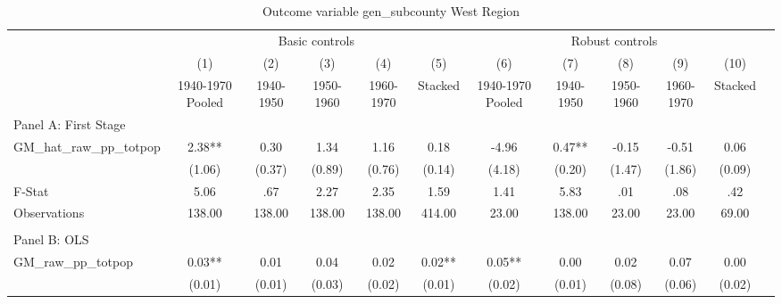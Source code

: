  \begin{table}[htbp]\centering {} \begin{threeparttable} \caption{Outcome variable gen\_subcounty West Region} \begin{tabular}{l*{11}{c}} \toprule
          &\multicolumn{5}{c}{Basic controls}                                   &\multicolumn{5}{c}{Robust controls}                                  \\\cmidrule(lr){2-6}\cmidrule(lr){7-11}
          &\multicolumn{1}{c}{(1)}&\multicolumn{1}{c}{(2)}&\multicolumn{1}{c}{(3)}&\multicolumn{1}{c}{(4)}&\multicolumn{1}{c}{(5)}&\multicolumn{1}{c}{(6)}&\multicolumn{1}{c}{(7)}&\multicolumn{1}{c}{(8)}&\multicolumn{1}{c}{(9)}&\multicolumn{1}{c}{(10)}\\
          &\multicolumn{1}{c}{1940-1970 Pooled}&\multicolumn{1}{c}{1940-1950}&\multicolumn{1}{c}{1950-1960}&\multicolumn{1}{c}{1960-1970}&\multicolumn{1}{c}{Stacked}&\multicolumn{1}{c}{1940-1970 Pooled}&\multicolumn{1}{c}{1940-1950}&\multicolumn{1}{c}{1950-1960}&\multicolumn{1}{c}{1960-1970}&\multicolumn{1}{c}{Stacked}\\
\cmidrule(lr){1-11}
\multicolumn{10}{l}{Panel A: First Stage}\\
\cmidrule(lr){1-11}
GM\_hat\_raw\_pp\_totpop&      2.38** &      0.30   &      1.34   &      1.16   &      0.18   &     -4.96   &      0.47** &     -0.15   &     -0.51   &      0.06   \\
          &    (1.06)   &    (0.37)   &    (0.89)   &    (0.76)   &    (0.14)   &    (4.18)   &    (0.20)   &    (1.47)   &    (1.86)   &    (0.09)   \\
\midrule
F-Stat    &      5.06   &       .67   &      2.27   &      2.35   &      1.59   &      1.41   &      5.83   &       .01   &       .08   &       .42   \\
Observations&    138.00   &    138.00   &    138.00   &    138.00   &    414.00   &     23.00   &    138.00   &     23.00   &     23.00   &     69.00   \\
\cmidrule[\heavyrulewidth](lr){1-11} \\ \cmidrule[\heavyrulewidth](lr){1-11}
\multicolumn{10}{l}{Panel B: OLS}\\
\cmidrule(lr){1-11}
GM\_raw\_pp\_totpop&      0.03** &      0.01   &      0.04   &      0.02   &      0.02** &      0.05** &      0.00   &      0.02   &      0.07   &      0.00   \\
          &    (0.01)   &    (0.01)   &    (0.03)   &    (0.02)   &    (0.01)   &    (0.02)   &    (0.01)   &    (0.08)   &    (0.06)   &    (0.02)   \\

\end{tabular}
\end{threeparttable}
\end{table}
